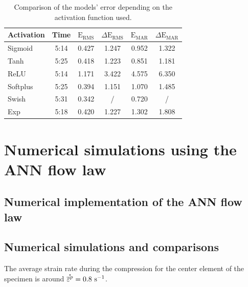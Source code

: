 \documentclass[algorithms,article,submit,pdftex,moreauthors]{Definitions/mdpi}
\DeclareRobustCommand{\mdot}[1]{\accentset{\mbox{\bfseries .}}{#1}}
\DeclareRobustCommand{\RMSE}{\text{E}_\text{RMS}}
\DeclareRobustCommand{\MARE}{\text{E}_\text{MAR}}
\DeclareRobustCommand{\ps}{\text{s}^{-1}}
\begin{document}
\begin{table}[H]
\caption{Comparison of the models' error depending on the activation function used.}
\begin{tabular}{lccccc}
\toprule
Activation & Time & $\RMSE$ & $\Delta\RMSE$ & $\MARE$  & $\Delta\MARE$ \\ \midrule
Sigmoid & 5:14 & 0.427 & 1.247 & 0.952 & 1.322\\ 
Tanh & 5:25 & 0.418 & 1.223 & 0.851 & 1.181\\ 
ReLU & 5:14 & 1.171 & 3.422 & 4.575 & 6.350\\ 
Softplus & 5:25 & 0.394 & 1.151 & 1.070 & 1.485\\
Swish & 5:31 & 0.342 & / &0.720 & / \\ 
Exp & 5:18 & 0.420 & 1.227 & 1.302 & 1.808\\ 
\bottomrule
\end{tabular}
\end{table}


\section{Numerical simulations using the ANN flow law}\label{sec:Numerical}

\subsection{Numerical implementation of the ANN flow law}\label{subsec:Num-impl}

\subsection{Numerical simulations and comparisons}\label{subsec:Num-sim}

The average strain rate during the compression for the center element of the specimen is around $\mdot{\overline{\varepsilon}^p}=0.8~\ps$.
\end{document}
